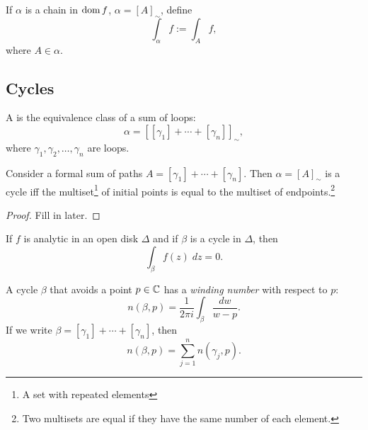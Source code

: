 \begin{definition}
    If $\alpha$ is a chain in $\operatorname{dom} f$, $\alpha = {[A]}_{\sim}$,
    define
    \[ \int_{\alpha} f := \int_A f, \]
    where $A \in \alpha$.
\end{definition}

\subsection{Cycles}
\begin{definition}
    A  is the equivalence class of a sum of loops:
    \[ \alpha = {[ [\gamma_1] + \cdots + [\gamma_n]]}_{\sim}, \]
    where $\gamma_1, \gamma_2, \ldots, \gamma_n$ are loops.
\end{definition}

\begin{theorem}
    Consider a formal sum of paths $A = [\gamma_1] + \cdots + 
    [\gamma_n]$.
    Then $\alpha = {[A]}_{\sim}$ is a cycle iff the multiset\footnote{A set with repeated elements} of initial points is equal
    to the multiset of endpoints.\footnote{Two multisets are 
    equal if they have the same number of each element.}
\end{theorem}

\begin{proof}
    Fill in later.
\end{proof}
 
\begin{theorem}
    If $f$ is analytic in an open disk $\Delta$ and if $\beta$
    is a cycle in $\Delta$, then
    \[ \int_{\beta} f(z) \; dz = 0. \]
\end{theorem}
A cycle $\beta$ that avoids a point $p \in \operatorname{\mathbb{C}}$ has a 
\textit{winding number} with respect to $p$:
\[ n(\beta, p) = \frac{1}{2\pi i}\int_{\beta} \frac{dw}{w-p}.\]
If we write $\beta = [\gamma_1] + \cdots + [\gamma_n]$, then
\[ n(\beta, p) = \sum_{j=1}^n n(\gamma_j, p). \]

